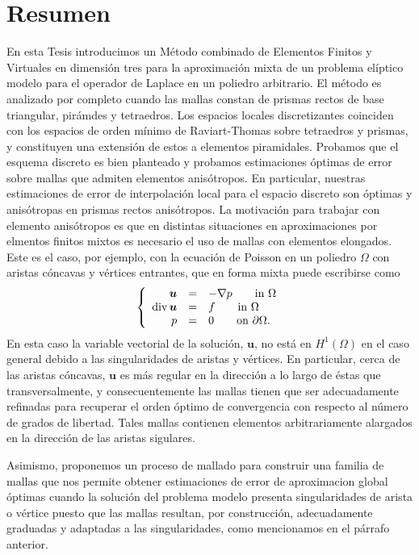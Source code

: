 \documentclass[12pt,a4paper,openany,oneside]{book}
\begin{document}
\section*{Resumen}
En esta Tesis introducimos un M\'etodo combinado
de Elementos Finitos y Virtuales en dimensi\'on tres 
para
la aproximaci\'on mixta 
de un problema el\'iptico modelo para el operador
de Laplace en un poliedro arbitrario.
El m\'etodo es analizado por completo
cuando las mallas constan de prismas rectos de base triangular, pir\'amdes y tetraedros. Los espacios locales
discretizantes coinciden con los espacios de orden m\'inimo
de Raviart-Thomas 
sobre tetraedros y prismas, y constituyen una extensi\'on
de estos a elementos piramidales. Probamos que el 
esquema discreto es bien planteado y 
probamos estimaciones \'optimas de error
sobre mallas 
que admiten elementos anis\'otropos. En particular, 
 nuestras estimaciones de 
error
de 
interpolaci\'on 
local 
para el espacio discreto son \'optimas y 
anis\'otropas en prismas rectos anis\'otropos. La motivaci\'on
para trabajar con elemento anis\'otropos es que en
distintas situaciones en aproximaciones por elmentos finitos mixtos
es necesario el uso de mallas con elementos elongados.
Este es el caso, por ejemplo, con la ecuaci\'on de Poisson en un
poliedro $\Omega$ con aristas c\'oncavas y v\'ertices entrantes,
que en forma mixta puede escribirse como
\begin{equation*}\label{mf} \left\{\begin{array}{rcl}
\boldsymbol{u}&=&-\nabla p\qquad \mbox{in }\Omega\\
\mbox{div\,}\boldsymbol{u}&=&f\qquad \mbox{in }\Omega\\
p&=&0\qquad\mbox{on }\partial\Omega.\end{array}\right.
\end{equation*}
En esta caso la variable vectorial de la soluci\'on, $\boldsymbol{u}$,
no est\'a en $H^1(\Omega)$ en el caso general debido a las singularidades 
de aristas y v\'ertices. En particular, cerca de las aristas c\'oncavas,
$\boldsymbol{u}$ es m\'as regular en la direcci\'on a lo largo de \'estas
que transversalmente, y consecuentemente las mallas tienen que ser
adecuadamente refinadas para recuperar el orden \'optimo de convergencia
con respecto al n\'umero de grados de libertad. Tales mallas  contienen
elementos arbitrariamente alargados en la direcci\'on de las aristas sigulares.

Asimismo, proponemos un proceso de mallado
para construir una familia de mallas que nos permite
obtener estimaciones de error de aproximacion global
\'optimas cuando la soluci\'on del problema modelo
presenta singularidades de arista o v\'ertice
puesto que las mallas resultan, por construcci\'on,
adecuadamente gra\-duadas y adaptadas 
a las singularidades, como mencionamos en el p\'arrafo anterior.
\end{document}
